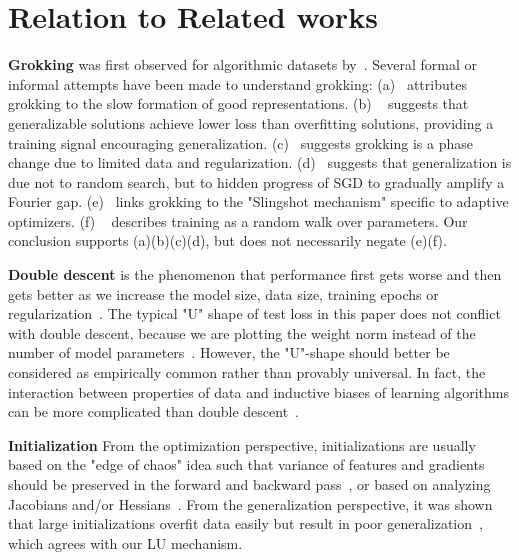 \documentclass{article} %
\begin{document}
\section{Relation to Related works}\label{sec:related_works}
{\bf Grokking} was first observed for algorithmic datasets by~\citep{power2022grokking}. Several formal or informal attempts have been made to understand grokking: (a)~\citep{liu2022towards} attributes grokking to the slow formation of good representations. (b) ~\citep{rohin2021grokking} suggests that
generalizable solutions  achieve lower loss than overfitting solutions, providing a training signal
encouraging generalization. (c)~\citep{neel2022} suggests grokking is a phase change due to limited data and regularization. (d)~\citep{barak2022hidden} suggests that generalization is due not to random search, but to hidden progress of SGD to gradually amplify a Fourier gap. (e)~\citep{thilak2022slingshot} links grokking to the "Slingshot mechanism" specific to adaptive optimizers. (f) ~\citep{beren2022grokking} describes training as a random walk over parameters. Our conclusion supports (a)(b)(c)(d), but does not necessarily negate (e)(f).

{\bf Double descent} is the phenomenon that performance first gets worse and then gets better as we increase the model size, data size, training epochs or regularization~\citep{nakkiran2021deep,yilmaz2022regularization}. The typical "U" shape of test loss in this paper does not conflict with double descent, because we are plotting the weight norm instead of the number of model parameters~\citep{CS229}. However, the "U"-shape should better be considered as empirically common rather than provably universal. In fact, the interaction between properties of data and inductive biases of learning algorithms can be more complicated than double descent~\citep{chen2021multiple, d2020triple}.

{\bf Initialization} From the optimization perspective, initializations are usually based on the "edge of chaos" idea such that variance of features and gradients should be preserved in the forward and backward pass~\citep{glorot2010understanding,he2015delving,bahri2020statistical, yang2017mean,jing2017tunable}, or based on analyzing Jacobians and/or Hessians~\citep{skorski2020revisiting}. From the generalization perspective, it was shown that large initializations overfit data easily but result in poor generalization~\citep{xu2019training,zhang2020type}, which agrees with our LU mechanism.

\end{document}
